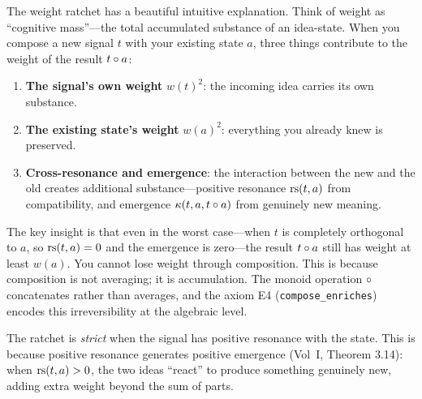 \begin{remark}
\label{rem:ratchet-intuition}
The weight ratchet has a beautiful intuitive explanation.  Think of weight
as ``cognitive mass''---the total accumulated substance of an idea-state.
When you compose a new signal $t$ with your existing state $a$, three
things contribute to the weight of the result $t \circ a$:

\begin{enumerate}
  \item \textbf{The signal's own weight} $w(t)^2$: the incoming idea carries
        its own substance.
  \item \textbf{The existing state's weight} $w(a)^2$: everything you already
        knew is preserved.
  \item \textbf{Cross-resonance and emergence}: the interaction between the
        new and the old creates additional substance---positive resonance
        $\mathrm{rs}(t, a)$ from compatibility, and emergence $\kappa(t, a, t \circ a)$
        from genuinely new meaning.
\end{enumerate}

The key insight is that even in the worst case---when $t$ is completely
orthogonal to $a$, so $\mathrm{rs}(t, a) = 0$ and the emergence is zero---the result
$t \circ a$ still has weight at least $w(a)$.  You cannot lose weight through
composition.  This is because composition is not averaging; it is accumulation.
The monoid operation $\circ$ concatenates rather than averages, and the
axiom E4 (\texttt{compose\_enriches}) encodes this irreversibility at the
algebraic level.

The ratchet is \emph{strict} when the signal has positive resonance with the
state.  This is because positive resonance generates positive emergence
(Vol~I, Theorem 3.14): when $\mathrm{rs}(t, a) > 0$, the two ideas ``react'' to produce
something genuinely new, adding extra weight beyond the sum of parts.
\end{remark}


